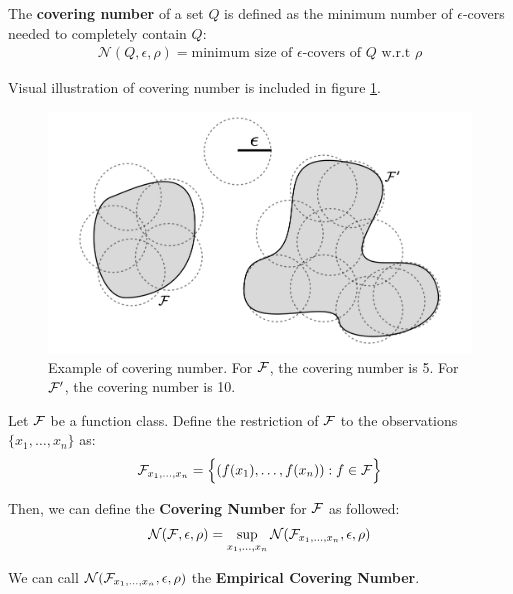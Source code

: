 \begin{definition}
    The \textbf{covering number} of a set $Q$ is defined as the minimum number of $\epsilon$-covers needed to completely contain $Q$:
    \begin{align*}
        \mathcal{N}(Q, \epsilon, \rho) = \text{minimum size of $\epsilon$-covers of $Q$ w.r.t $\rho$}
    \end{align*}

    \noindent Visual illustration of covering number is included in figure \ref{fig:covering_number}.
\end{definition}

\begin{figure}[ht]
    \centering
    \includegraphics[width=\textwidth]{figures/covering_number.png}
    \caption{Example of covering number. For $\mathcal{F}$, the covering number is 5. For $\mathcal{F}'$, the covering number is 10.}
    \label{fig:covering_number}
\end{figure}


\begin{definition}
    Let $\mathcal{F}$ be a function class. Define the restriction of $\mathcal{F}$ to the observations $\{x_1, \dots, x_n\}$ as:
    \begin{align*}
        \mathcal{F}_{x_1, \dots, x_n} = \Big\{ 
            (f(x_1), \dots, f(x_n)) : f \in \mathcal{F}
         \Big\}
    \end{align*}

    \noindent Then, we can define the \textbf{Covering Number} for $\mathcal{F}$ as followed:
    \begin{align*}
        \mathcal{N}(\mathcal{F}, \epsilon, \rho) = \sup_{x_1, \dots, x_n} \mathcal{N}(\mathcal{F}_{x_1, \dots, x_n}, \epsilon, \rho)
    \end{align*}

    \noindent We can call $\mathcal{N}(\mathcal{F}_{x_1, \dots, x_n}, \epsilon, \rho)$ the \textbf{Empirical Covering Number}.
\end{definition}

